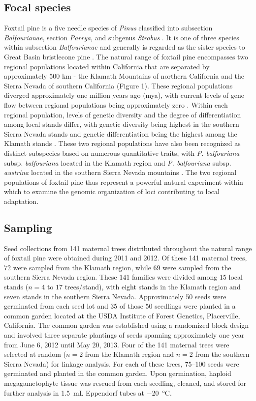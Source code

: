 \documentclass[11pt]{article}
\begin{document}
\subsection*{Focal species}
Foxtail pine is a five needle species of \textit{Pinus} classified into 
subsection \textit{Balfourianae}, section \textit{Parrya}, and subgenus \textit{Strobus} 
\citep{Gernandt:2005}. It is one of three species within subsection \textit{Balfourianae} 
\citep{Bailey:1970} and generally is regarded as the sister species to Great Basin bristlecone pine \citep[\textit{P. longaeva} D. K. Bailey; see][] 
{Eckert:2006a}. The natural range of foxtail pine encompasses two 
regional populations located within California that are separated by approximately 500 km - 
the Klamath Mountains of northern California and the Sierra Nevada of southern California 
(Figure 1). These regional populations diverged approximately one million years ago (mya), 
with current levels of gene flow between regional populations being approximately zero 
\citep{Eckert:2008}. Within each regional population, levels of genetic diversity and the 
degree of differentiation among local stands differ, with genetic diversity being highest in 
the southern Sierra Nevada stands and genetic differentiation being the highest among the 
Klamath stands \citep{Oline:2000, Eckert:2008}. These two regional populations
have also been recognized as distinct subspecies based on numerous quantitative traits, with \textit{P. balfouriana}
subsp. \textit{balfouriana} located in the Klamath region and \textit{P. balfouriana} subsp. \textit{austrina} located in the southern
Sierra Nevada mountains \citep{Mastrogiuseppe:1980}. The two regional populations of foxtail pine 
thus represent a powerful natural experiment within which to examine the genomic organization of loci contributing to local adaptation. 

\subsection*{Sampling}
Seed collections from 141 maternal trees distributed throughout the natural range 
of foxtail pine were obtained during 2011 and 2012. Of these 141 maternal trees, 72 were sampled from the 
Klamath region, while 69 were sampled from the southern Sierra Nevada region. These 141 families were
divided among 15 local stands ($n = 4$ to $17$ trees/stand), with eight stands in the Klamath region and seven stands in the southern Sierra Nevada.
Approximately 50 seeds were germinated from each seed lot and 35 of those 50 seedlings were planted in a 
common garden located at the USDA Institute of Forest Genetics, Placerville, California. The 
common garden was established using a randomized block design and involved three separate plantings of seeds spanning
approximately one year from June 6, 2012 until May 20, 2013. Four of the 141 maternal trees were selected 
at random ($n = 2$ from the Klamath region and $n = 2$ from the southern Sierra Nevada) for linkage analysis. 
For each of these trees, \SIrange{75}{100}{} seeds were germinated and planted in the common garden. 
Upon germination, haploid megagametophyte tissue was rescued from each seedling, cleaned, and stored for further 
analysis in \SI{1.5}{\mL} Eppendorf tubes at \SI{-20}{\celsius}.
\end{document}
